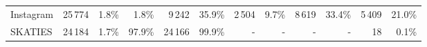 {\begin{tabular}{lrrrrrrrrrrr}
Instagram           &       25\,774   &        1.8\% &                 1.8\% &              9\,242 &             35.9\% &              2\,504 &              9.7\% &              8\,619 &             33.4\% &             5\,409 &            21.0\% \\
SKATIES             &       24\,184   &        1.7\% &                97.9\% &             24\,166 &             99.9\% &                 -   &                 - &                 -    &                 -  &               18   &             0.1\% \\
\bottomrule
\end{tabular}
}